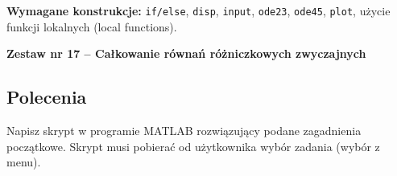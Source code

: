 \documentclass[a4paper,11pt]{article}
\begin{document}
\vspace{0.3cm}
\begin{ramka}
\textbf{Wymagane konstrukcje:}
\texttt{if/else}, \texttt{disp}, \texttt{input}, \texttt{ode23}, \texttt{ode45}, \texttt{plot}, użycie funkcji lokalnych (local functions).
\end{ramka}

\clearpage
\begin{center}
  {\large\bfseries Zestaw nr 17 \quad -- \quad Całkowanie równań różniczkowych zwyczajnych}
\end{center}
\hrulefill
\vspace{0.4cm}

\subsection*{Polecenia}

Napisz skrypt w programie MATLAB rozwiązujący podane zagadnienia początkowe. Skrypt musi pobierać od użytkownika wybór zadania (wybór z menu).
\end{document}
